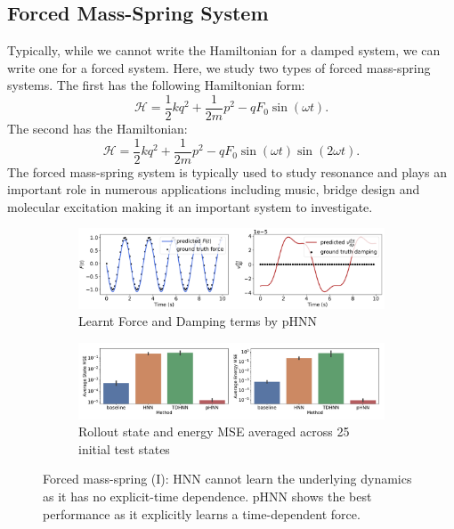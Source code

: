 \documentclass{article}
\begin{document}
\subsection{Forced Mass-Spring System}

Typically, while we cannot write the Hamiltonian for a damped system, we can write one for a forced system. Here, we study two types of forced mass-spring systems. The first has the following Hamiltonian form:
\begin{equation}
\mathcal{H} = \frac{1}{2}kq^2 + \frac{1}{2m}p^2 - qF_0\sin(\omega t).
\end{equation}
The second has the Hamiltonian:
\begin{equation}
\mathcal{H} = \frac{1}{2}kq^2 + \frac{1}{2m}p^2 - qF_0\sin(\omega t)\sin(2\omega t).
\end{equation}
The forced mass-spring system is typically used to study resonance and plays an important role in numerous applications including music, bridge design and molecular excitation making it an important system to investigate.

\begin{figure}[h!]
\centering
\captionsetup{justification=centering}
	\begin{subfigure}[b]{0.48\textwidth}
		\centering
		\includegraphics[width=\textwidth]{figures/figures/forced_mass_spring/1/forced_mass_spring_dpdt_new_0.pdf}
		\caption{Learnt Force and Damping terms by pHNN}
	\end{subfigure}
	\begin{subfigure}[b]{0.48\textwidth}
	    \centering
		\includegraphics[width=\textwidth]{figures/figures/forced_mass_spring/1/forced_mass_spring_errors_0.pdf}
		\caption{Rollout state and energy MSE averaged across 25 initial test states}
	\end{subfigure}
\caption{Forced mass-spring (I): HNN cannot learn the underlying dynamics as it has no explicit-time dependence. pHNN shows the best performance as it explicitly learns a time-dependent force.}
\label{fig.fmspring1}
\end{figure}
\end{document}
